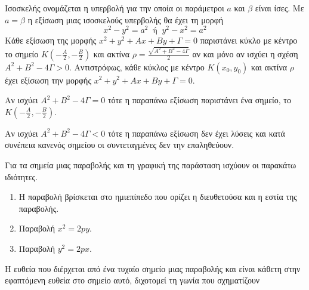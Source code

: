 \documentclass[twoside,nofonts,internet,shmeiwseis]{thewria}
\begin{document}
Ισοσκελής ονομάζεται η υπερβολή για την οποία οι παράμετροι $ a $ και $ \beta $ είναι ίσες. Με $ a=\beta $ η εξίσωση μιας ισοσκελούς υπερβολής θα έχει τη μορφή \[ x^2-y^2=a^2\;\;\textrm{ή}\;\; y^2-x^2=a^2 \]
\thewrhmata
{}
Κάθε εξίσωση της μορφής $ x^2+y^2+Ax+By+\varGamma=0 $ παριστάνει κύκλο με κέντρο το σημείο $ K\left(-\frac{A}{2},-\frac{B}{2} \right) $ και ακτίνα $ \rho=\frac{\sqrt{A^2+B^2-4\varGamma}}{2} $ αν και μόνο αν ισχύει η σχέση $ A^2+B^2-4\varGamma>0 $. Αντιστρόφως, κάθε κύκλος με κέντρο $ K(x_0,y_0) $ και ακτίνα $ \rho $ έχει εξίσωση την μορφής $ x^2+y^2+Ax+By+\varGamma=0 $.
\begin{rlist}
\item Αν ισχύει $ A^2+B^2-4\varGamma=0 $ τότε η παραπάνω εξίσωση παριστάνει ένα σημείο, το $ K\left(-\frac{A}{2},-\frac{B}{2} \right) $.
\item Αν ισχύει $ A^2+B^2-4\varGamma<0 $ τότε η παραπάνω εξίσωση δεν έχει λύσεις και κατά συνέπεια κανενός σημείου οι συντεταγμένες δεν την επαληθεύουν.
\end{rlist}
Για τα σημεία μιας παραβολής και τη γραφική της παράσταση ισχύουν οι παρακάτω ιδιότητες.
\begin{enumerate}
\item Η παραβολή βρίσκεται στο ημιεπίπεδο που ορίζει η διευθετούσα και η εστία της παραβολής.
\item Παραβολή $ x^2=2py $.
\item  Παραβολή $ y^2=2px $.
\end{enumerate}
Η ευθεία που διέρχεται από ένα τυχαίο σημείο μιας παραβολής και είναι κάθετη στην εφαπτόμενη ευθεία στο σημείο αυτό, διχοτομεί τη γωνία που σχηματίζουν
\end{document}
